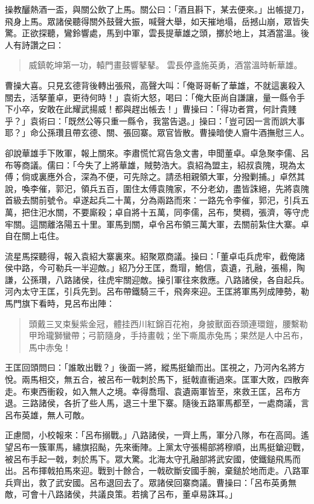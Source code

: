 操教釃熱酒一盃，與關公飲了上馬。關公曰：「酒且斟下，某去便來。」出帳提刀，飛身上馬。眾諸侯聽得關外鼓聲大振，喊聲大舉，如天摧地塌，岳撼山崩，眾皆失驚。正欲探聽，鸞鈴響處，馬到中軍，雲長提華雄之頭，擲於地上，其酒當溫。後人有詩讚之曰：

\begin{quote}
威鎮乾坤第一功，轅門畫鼓響鼕鼕。
雲長停盞施英勇，酒當溫時斬華雄。
\end{quote}

曹操大喜。只見玄德背後轉出張飛，高聲大叫：「俺哥哥斬了華雄，不就這裏殺入關去，活拏董卓，更待何時！」袁術大怒，喝曰：「俺大臣尚自謙讓，量一縣令手下小卒，安敢在此耀武揚威！都與趕出帳去！」曹操曰：「得功者賞，何計貴賤乎？」袁術曰：「既然公等只重一縣令，我當告退。」操曰：「豈可因一言而誤大事耶？」命公孫瓚且帶玄德、關、張回寨。眾官皆散。曹操暗使人齎牛酒撫慰三人。

卻說華雄手下敗軍，報上關來。李肅慌忙寫告急文書，申聞董卓。卓急聚李儒、呂布等商議。儒曰：「今失了上將華雄，賊勢浩大。袁紹為盟主，紹叔袁隗，現為太傅；倘或裏應外合，深為不便，可先除之。請丞相親領大軍，分撥剿捕。」卓然其說，喚李催，郭汜，領兵五百，圍住太傅袁隗家，不分老幼，盡皆誅絕，先將袁隗首級去關前號令。卓遂起兵二十萬，分為兩路而來：一路先令李催，郭汜，引兵五萬，把住汜水關，不要廝殺；卓自將十五萬，同李儒，呂布，樊稠，張濟，等守虎牢關。這關離洛陽五十里。軍馬到關，卓令呂布領三萬大軍，去關前紮住大寨。卓自在關上屯住。

流星馬探聽得，報入袁紹大寨裏來。紹聚眾商議。操曰：「董卓屯兵虎牢，截俺諸侯中路，今可勒兵一半迎敵。」紹乃分王匡，喬瑁，鮑信，袁遺，孔融，張楊，陶謙，公孫瓚，八路諸侯，往虎牢關迎敵。操引軍往來救應。八路諸侯，各自起兵。河內太守王匡，引兵先到。呂布帶鐵騎三千，飛奔來迎。王匡將軍馬列成陣勢，勒馬門旗下看時，見呂布出陣：

\begin{quote}
頭戴三叉束髮紫金冠，體挂西川紅錦百花袍，身披獸面吞頭連環鎧，腰繫勒甲玲瓏獅蠻帶；弓箭隨身，手持畫戟；坐下嘶風赤兔馬；果然是人中呂布，馬中赤兔！
\end{quote}

王匡回頭問曰：「誰敢出戰？」後面一將，縱馬挺鎗而出。匡視之，乃河內名將方悅。兩馬相交，無五合，被呂布一戟刺於馬下，挺戟直衝過來。匡軍大敗，四散奔走。布東西衝殺，如入無人之境。幸得喬瑁、袁遺兩軍皆至，來救王匡，呂布方退。三路諸侯，各折了些人馬，退三十里下寨。隨後五路軍馬都至，一處商議，言呂布英雄，無人可敵。

正慮間，小校報來：「呂布搦戰。」八路諸侯，一齊上馬，軍分八隊，布在高岡。遙望呂布一簇軍馬，繡旗招颭，先來衝陣。上黨太守張楊部將穆順，出馬挺鎗迎戰，被呂布手起一戟，刺於馬下。眾大驚。北海太守孔融部將武安國，使鐵鎚飛馬而出。呂布揮戟拍馬來迎。戰到十餘合，一戟砍斷安國手腕，棄鎚於地而走。八路軍兵齊出，救了武安國。呂布退回去了。眾諸侯回寨商議。曹操曰：「呂布英勇無敵，可會十八路諸侯，共議良策。若擒了呂布，董卓易誅耳。」

